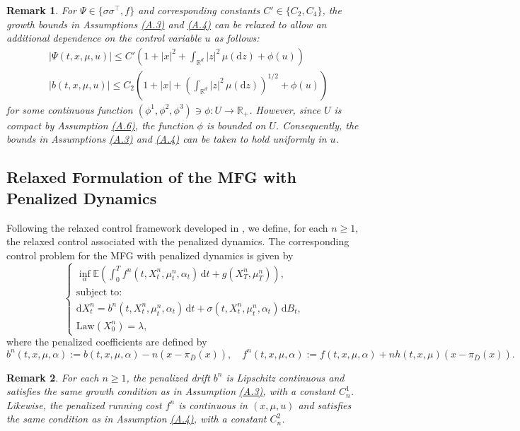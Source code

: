 \documentclass[11pt,amsfonts]{article}
\theoremstyle{plain}
\newtheorem{remark}{Remark}
\theoremstyle{assumpstyle}
\numberwithin{equation}{section}
\numberwithin{theorem}{section}
\numberwithin{proposition}{section}
\numberwithin{definition}{section}
\numberwithin{remark}{section}
\numberwithin{corollary}{section}
\numberwithin{lemma}{section}
\begin{document}
\begin{remark}
For $\Psi \in \{\sigma \sigma^\top, f \}$ and corresponding constants $C' \in \{ C_2, C_4 \}$, the growth bounds in  Assumptions \hyperlink{A.3}{(A.3)} and \hyperlink{A.4}{(A.4)} can be relaxed to allow an additional dependence on the control variable $u$ as follows:
\begin{align*}
&|\Psi(t, x, \mu, u)| \leq C' \left( 1 + |x|^2 + \int_{\mathbb{R}^d} |z|^2 \, \mu(\mathrm{d}z) + \phi(u) \right) \\
&|b(t, x, \mu, u)|\leq C_2 \left( 1 + |x|+ \left(\int_{\mathbb{R}^d} |z|^2 \, \mu(\mathrm{d}z)\right)^{1/2} + \phi(u) \right)
\end{align*}
for some continuous function $(\phi^1, \phi^2, \phi^3) \ni\phi : U \to \mathbb{R}_+$.  
However, since $U$ is compact by Assumption \hyperlink{A.6}{(A.6)}, the function $\phi$ is bounded on $U$. Consequently, the bounds in Assumptions \hyperlink{A.3}{(A.3)} and \hyperlink{A.4}{(A.4)} can be taken to hold uniformly in $u$. 
\end{remark}
\subsection{Relaxed Formulation of the MFG with Penalized Dynamics}

Following the relaxed control framework developed in \cite{laker}, we define, for each $ n \geq 1 $, the relaxed control associated with the penalized dynamics. The corresponding control problem for the MFG with penalized dynamics is given by
\begin{equation} 
\begin{cases}
\displaystyle \inf_{\alpha} \mathbb{E} \left( \int_0^T f^n(t, X_t^n, \mu_t^n, \alpha_t) \, \mathrm{d}t + g(X_T^n, \mu_T^n) \right), \\
\text{subject to:} \\
\mathrm{d}X_t^n = b^n(t, X_t^n, \mu_t^n, \alpha_t) \, \mathrm{d}t + \sigma(t, X_t^n, \mu_t^n, \alpha_t) \, \mathrm{d}B_t, \\
\text{Law}(X_0^n) = \lambda,
\end{cases}
\end{equation}
where the penalized coefficients are defined by
\begin{equation*}
b^n(t, x, \mu, \alpha) := b(t, x, \mu, \alpha) - n(x - \pi_{\bar{D}}(x)), \quad f^n(t,x,\mu,\alpha) := f(t,x,\mu,\alpha) + n h(t,x, \mu)(x - \pi_{\bar{D}}(x)).
\end{equation*}
\begin{remark}\label{Penalized-coeff}
For each $ n \geq 1 $, the penalized drift $ b^n $ is Lipschitz continuous and satisfies the same growth condition as in Assumption \hyperlink{A.3}{(A.3)}, with a constant $ C^1_n $. Likewise, the penalized running cost $ f^n $ is continuous in $ (x, \mu, u) $ and satisfies the same condition as in Assumption \hyperlink{A.4}{(A.4)}, with a constant $ C^2_n $.
\end{remark}
\end{document}
